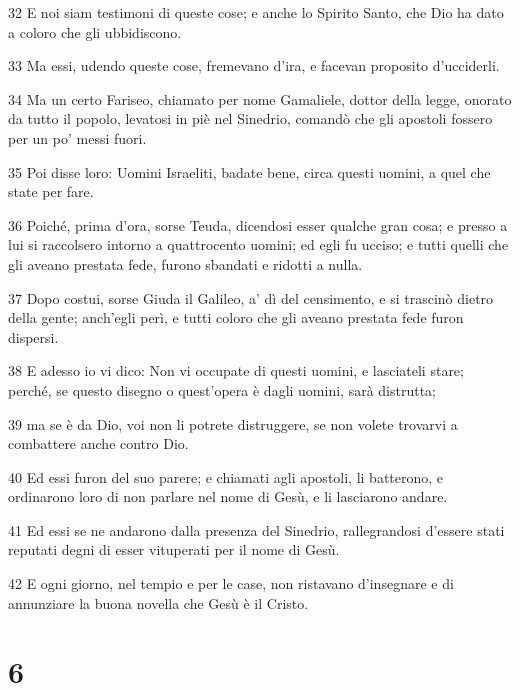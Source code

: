 \par 32 E noi siam testimoni di queste cose; e anche lo Spirito Santo, che Dio ha dato a coloro che gli ubbidiscono.
\par 33 Ma essi, udendo queste cose, fremevano d'ira, e facevan proposito d'ucciderli.
\par 34 Ma un certo Fariseo, chiamato per nome Gamaliele, dottor della legge, onorato da tutto il popolo, levatosi in piè nel Sinedrio, comandò che gli apostoli fossero per un po' messi fuori.
\par 35 Poi disse loro: Uomini Israeliti, badate bene, circa questi uomini, a quel che state per fare.
\par 36 Poiché, prima d'ora, sorse Teuda, dicendosi esser qualche gran cosa; e presso a lui si raccolsero intorno a quattrocento uomini; ed egli fu ucciso; e tutti quelli che gli aveano prestata fede, furono sbandati e ridotti a nulla.
\par 37 Dopo costui, sorse Giuda il Galileo, a' dì del censimento, e si trascinò dietro della gente; anch'egli perì, e tutti coloro che gli aveano prestata fede furon dispersi.
\par 38 E adesso io vi dico: Non vi occupate di questi uomini, e lasciateli stare; perché, se questo disegno o quest'opera è dagli uomini, sarà distrutta;
\par 39 ma se è da Dio, voi non li potrete distruggere, se non volete trovarvi a combattere anche contro Dio.
\par 40 Ed essi furon del suo parere; e chiamati agli apostoli, li batterono, e ordinarono loro di non parlare nel nome di Gesù, e li lasciarono andare.
\par 41 Ed essi se ne andarono dalla presenza del Sinedrio, rallegrandosi d'essere stati reputati degni di esser vituperati per il nome di Gesù.
\par 42 E ogni giorno, nel tempio e per le case, non ristavano d'insegnare e di annunziare la buona novella che Gesù è il Cristo.

\chapter{6}

